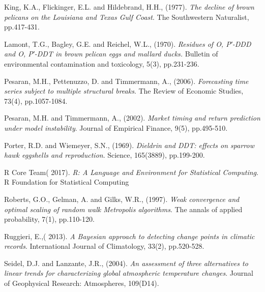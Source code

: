 \documentclass[submit]{smj}
\begin{document}
\begin{thebibliography}{99}
King, K.A., Flickinger, E.L. and Hildebrand, H.H., (1977). 
\textit{The decline of brown pelicans on the Louisiana and Texas Gulf Coast}.
The Southwestern Naturalist, pp.417-431.

Lamont, T.G., Bagley, G.E. and Reichel, W.L., (1970). 
\textit{Residues of O, P′-DDD and O, P′-DDT in brown pelican eggs and mallard ducks.} Bulletin of environmental contamination and toxicology, 5(3), pp.231-236.


Pesaran, M.H., Pettenuzzo, D. and Timmermann, A., (2006). 
\textit{Forecasting time series subject to multiple structural breaks}. 
The Review of Economic Studies, 73(4), pp.1057-1084.

Pesaran, M.H. and Timmermann, A., (2002).
\textit{Market timing and return prediction under model instability}. 
Journal of Empirical Finance, 9(5), pp.495-510.

Porter, R.D. and Wiemeyer, S.N., (1969). 
\textit{Dieldrin and DDT: effects on sparrow hawk eggshells and reproduction}. 
Science, 165(3889), pp.199-200.

R Core Team( 2017). 
\textit{R: A Language and Environment for Statistical Computing}.
R Foundation for Statistical Computing

Roberts, G.O., Gelman, A. and Gilks, W.R., (1997). 
\textit{Weak convergence and optimal scaling of random walk Metropolis algorithms}. The annals of applied probability, 7(1), pp.110-120.

Ruggieri, E.,( 2013). 
\textit{A Bayesian approach to detecting change points in climatic records}.
International Journal of Climatology, 33(2), pp.520-528.

Seidel, D.J. and Lanzante, J.R., (2004). 
\textit{An assessment of three alternatives to linear trends for characterizing global atmospheric temperature changes}. 
Journal of Geophysical Research: Atmospheres, 109(D14). 


\end{thebibliography}
\end{document}
